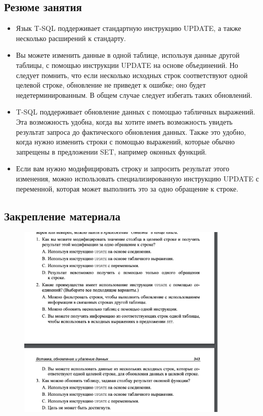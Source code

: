 \subsection*{Резюме занятия}
\begin{itemize}
	\item Язык T-SQL поддерживает стандартную инструкцию UPDATE, а также несколько
	расширений к стандарту. 
	\item Вы можете изменить данные в одной таблице, используя данные другой таблицы, с помощью инструкции UPDATE на основе объединений. Но следует помнить,
	что если несколько исходных строк соответствуют одной целевой строке, обновление не приведет к ошибке; оно будет недетерминированным. В общем
	случае следует избегать таких обновлений. 
	\item T-SQL поддерживает обновление данных с помощью табличных выражений.
	Эта возможность удобна, когда вы хотите иметь возможность увидеть результат
	запроса до фактического обновления данных. Также это удобно, когда нужно
	изменить строки с помощью выражений, которые обычно запрещены в предложении SET, например оконных функций. 
	\item  Если вам нужно модифицировать строку и запросить результат этого изменения,
	можно использовать специализированную инструкцию UPDATE с переменной, которая может выполнить это за одно обращение к строке. 
\end{itemize}


\subsection*{Закрепление материала}

\begin{figure}[h!]
	\begin{center}
		\includegraphics[width=0.9\textwidth]{img/zakrep21.png}
	\end{center}
	\captionsetup{justification=centering}
\end{figure}
\clearpage

